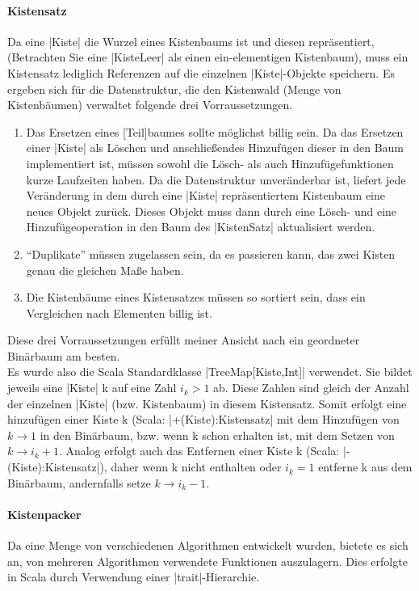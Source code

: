 \paragraph{Kistensatz}
Da eine |Kiste| die Wurzel eines Kistenbaums ist und diesen repräsentiert, (Betrachten Sie eine |KisteLeer| als einen ein-elementigen Kistenbaum),
  muss ein Kistensatz lediglich Referenzen auf die einzelnen |Kiste|-Objekte speichern.
Es ergeben sich für die Datenstruktur, die den Kistenwald (Menge von Kistenbäumen) verwaltet folgende drei Vorraussetzungen. 
\begin{enumerate}
 \item Das Ersetzen eines [Teil]baumes sollte möglichst billig sein.
Da das Ersetzen einer |Kiste| als Löschen und anschließendes Hinzufügen dieser in den Baum implementiert ist,
  müssen sowohl die Lösch- als auch Hinzufügefunktionen kurze Laufzeiten haben.
Da die Datenstruktur unveränderbar ist, liefert jede Veränderung in dem durch eine |Kiste| repräsentiertem Kistenbaum eine neues Objekt zurück.
Dieses Objekt muss dann durch eine Lösch- und eine Hinzufügeoperation in den Baum des |KistenSatz| aktualisiert werden.
 \item ``Duplikate'' müssen zugelassen sein, da es passieren kann, das zwei Kisten genau die gleichen Maße haben.
 \item Die Kistenbäume eines Kistensatzes müssen so sortiert sein, dass ein Vergleichen nach Elementen billig ist.
\end{enumerate}
Diese drei Vorraussetzungen erfüllt meiner Ansicht nach ein geordneter Binärbaum am besten. \\ %
Es wurde also die Scala Standardklasse |TreeMap[Kiste,Int]| verwendet. Sie bildet jeweils eine |Kiste| k auf eine Zahl $i_k > 1$ ab.
Diese Zahlen sind gleich der Anzahl der einzelnen |Kiste| (bzw. Kistenbaum) in diesem Kistensatz.
Somit erfolgt eine hinzufügen einer Kiste k (Scala: |+(Kiste):Kistensatz| mit dem Hinzufügen von $k \rightarrow 1$ in den Binärbaum,
  bzw. wenn k schon erhalten ist, mit dem Setzen von $k \rightarrow i_k + 1$.
Analog erfolgt auch das Entfernen einer Kiste k (Scala: |-(Kiste):Kistensatz|),
  daher wenn k nicht enthalten oder $i_k = 1$ entferne k aus dem Binärbaum, andernfalls setze $k \rightarrow i_k - 1$.

\paragraph{Kistenpacker}
Da eine Menge von verschiedenen Algorithmen entwickelt wurden, bietete es sich an, von mehreren Algorithmen verwendete Funktionen auszulagern.
Dies erfolgte in Scala durch Verwendung einer |trait|-Hierarchie. %
